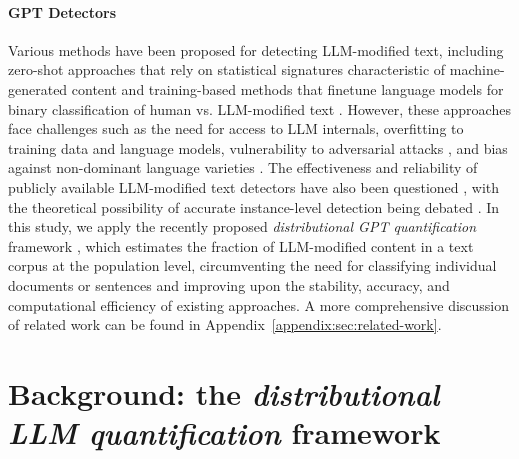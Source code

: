 \documentclass{article}
\begin{document}
\paragraph{GPT Detectors} 
Various methods have been proposed for detecting LLM-modified text, including zero-shot approaches that rely on statistical signatures characteristic of machine-generated content \citep{Lavergne2008DetectingFC,Badaskar2008IdentifyingRO,Beresneva2016ComputerGeneratedTD,solaiman2019release,Mitchell2023DetectGPTZM,Yang2023DNAGPTDN,Bao2023FastDetectGPTEZ,Tulchinskii2023IntrinsicDE} and training-based methods that finetune language models for binary classification of human vs. LLM-modified text \citep{Bhagat2013SquibsWI,Zellers2019DefendingAN,Bakhtin2019RealOF,Uchendu2020AuthorshipAF,Chen2023GPTSentinelDH,Yu2023GPTPT,Li2023DeepfakeTD,Liu2022CoCoCM,Bhattacharjee2023ConDACD,Hu2023RADARRA}. However, these approaches face challenges such as the need for access to LLM internals, overfitting to training data and language models, vulnerability to adversarial attacks \citep{Wolff2020AttackingNT}, and bias against non-dominant language varieties \citep{Liang2023GPTDA}. The effectiveness and reliability of publicly available LLM-modified text detectors have also been questioned \citep{OpenAIGPT2,jawahar2020automatic,fagni2021tweepfake,ippolito2019automatic,mitchell2023detectgpt,human-hard-to-detect-generated-text,mit-technology-review-how-to-spot-ai-generated-text,survey-2023,solaiman2019release,Kirchner2023,Kelly2023}, with the theoretical possibility of accurate instance-level detection being debated \citep{Weber-Wulff2023,Sadasivan2023CanAT,chakraborty2023possibilities}. In this study, we apply the recently proposed \textit{distributional GPT quantification} framework \citep{liang2024monitoring}, which estimates the fraction of LLM-modified content in a text corpus at the population level, circumventing the need for classifying individual documents or sentences and improving upon the stability, accuracy, and computational efficiency of existing approaches. 
A more comprehensive discussion of related work can be found in Appendix~\ref{appendix:sec:related-work}.



 

\section{Background: the \textit{distributional LLM quantification} framework} \label{main:sec: method}
\end{document}
